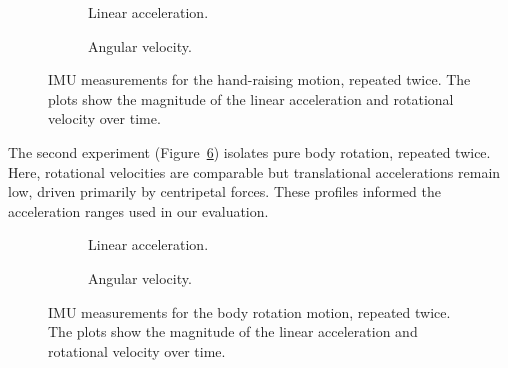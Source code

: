\documentclass[fleqn,10pt]{wlscirep}
\begin{document}
\begin{figure}[h!]
    \centering
    \begin{subfigure}{0.99\linewidth}
        \centering
        
        \vspace{-3 em}
        \caption{Linear acceleration.}
        \label{fig:imu_hand_linear}
    \end{subfigure}
    
    \begin{subfigure}{0.99\linewidth}
        \centering
        \vspace{0.5 em}
        
        \vspace{-3 em}
        \caption{Angular velocity.}
        \label{fig:imu_hand_angular}
    \end{subfigure}
    \caption{IMU measurements for the hand-raising motion, repeated twice. The plots show the magnitude of the linear acceleration and rotational velocity over time.}
    \label{fig:imu_hand_motion}
\end{figure}

The second experiment (Figure~\ref{fig:imu_body_rotation}) isolates pure body rotation, repeated twice. Here, rotational velocities are comparable but translational accelerations remain low, driven primarily by centripetal forces. These profiles informed the acceleration ranges used in our evaluation.

\begin{figure}[h!]
    \centering
    \begin{subfigure}{0.99\linewidth}
        \centering
        
        \vspace{-3 em}
        \caption{Linear acceleration.}
        \label{fig:imu_body_linear}
    \end{subfigure}

    \begin{subfigure}{0.99\linewidth}
        \centering
        \vspace{0.5 em}
        
        \vspace{-3 em}
        \caption{Angular velocity.}
        \label{fig:imu_body_angular}
    \end{subfigure}
    \caption{IMU measurements for the body rotation motion, repeated twice. The plots show the magnitude of the linear acceleration and rotational velocity over time.}
    \label{fig:imu_body_rotation}
\end{figure}
\end{document}

